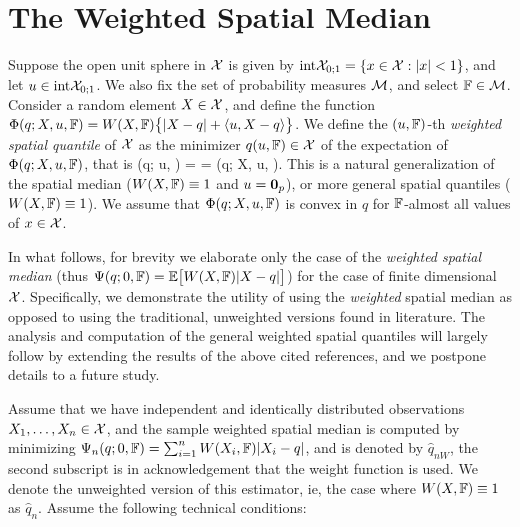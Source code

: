 \section{The Weighted Spatial Median}
\label{Sec:WSQuantiles}

Suppose the open unit sphere in $\mathcal{X}$ is given by 
$\textrm{int} {\mathcal{X}}_{0; 1} = \{ x \in \mathcal{X}: | x | < 1 \}$, and let
 $u \in \textrm{int} {\mathcal{X}}_{0; 1}$. We also fix the set of probability measures $\mathcal{M}$, 
 and select ${\mathbb{F}} \in \mathcal{M}$. Consider a random element $X \in \mathcal{X}$, and define the 
 function $\Phi (q; X, u, {\mathbb{F}}) = W (X, {\mathbb{F}}) \bigl\{ | X - q | 
+ \langle u, X - q \rangle \bigr\}$. 
We define the $(u, {\mathbb{F}})$-th \textit{weighted spatial quantile} of $\mathcal{X}$ 
as the minimizer $q (u, {\mathbb{F}}) \in \mathcal{X}$ of the expectation of $\Phi (q; X, u, {\mathbb{F}})$, 
that is
\baq
\Psi (q; u, \BF) = \BE {} = \BE \Phi (q; X, u, \BF).
\label{eq:WeightedQuantile}
\eaq
%
\noindent
This is a natural generalization of the spatial median \cite{ref:JASA96862_Chaudhuri, ref:Biometrika48414_Haldane,ref:AoS97435_Koltchinskii} ($W(X, {\mathbb{F}}) \equiv 1$ and $u = {\bf 0}_p$), or more general spatial quantiles \cite{ref:AoS17591_Cardotetal_Median_HilbertSpace, ref:AoS141203_ChakrabortyChaudhuri_Banach_Quantile, ref:Bernoulli152308_Minsker_Median_Banach} ($W(X, {\mathbb{F}}) \equiv 1$). We assume that 
$\Phi (q; X, u, {\mathbb{F}})$ is convex in $q$ for ${\mathbb{F}}$-almost all values of $x \in \mathcal{X}$. 
 

In what follows, for brevity we elaborate only the case of the \textit{weighted spatial median} (thus $\Psi (q; 0, {\mathbb{F}}) = {\mathbb{E}} \bigl[ W (X, {\mathbb{F}}) | X - q | \bigr] $) for the case of finite dimensional $\mathcal{X}$. Specifically, we demonstrate the utility of using the {\it weighted} spatial median as opposed to using the traditional, unweighted versions found in literature. The analysis and computation of the general weighted spatial quantiles will largely follow by extending the results of the above cited references, and we postpone details to a future study.

Assume that we have independent and identically distributed observations $X_{1}, \ldots, X_{n} \in \mathcal{X}$, and the sample weighted spatial median is computed by minimizing $\Psi_{n} (q; 0, {\mathbb{F}}) = \sum_{i = 1}^{n} W (X_{i}, {\mathbb{F}}) | X_{i} - q | $, and is denoted by $\hat{q}_{nW}$, the second subscript is in acknowledgement that the weight function is used. We denote the unweighted version of this estimator, ie, the case where $W (X, {\mathbb{F}}) \equiv 1$ as $\hat{q}_{n}$. Assume the following technical conditions:

